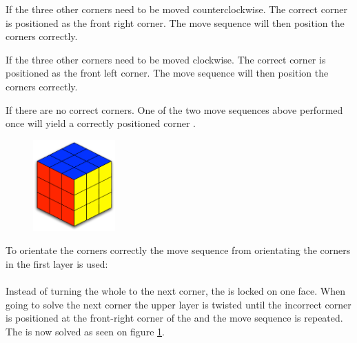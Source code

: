 If the three other corners need to be moved counterclockwise. The correct corner is positioned as the front right corner. The move sequence will then position the corners correctly.

If the three other corners need to be moved clockwise. The correct corner is positioned as the front left corner. The move sequence will then position the corners correctly.

If there are no correct corners. One of the two move sequences above performed once will yield a correctly positioned corner \cubie{}.

\begin{figure}
\begin{center}
	\includegraphics[width=0.28\textwidth]{input/pics/8done.pdf}	
\end{center}
\caption{}
\label{fig:8done}
\end{figure}

To orientate the corners correctly the move sequence from orientating the corners in the first layer is used: \\

 \\

Instead of turning the whole \cube{} to the next corner, the \cube{} is locked on one face. 
When going to solve the next corner \cubie{} the upper layer is twisted until the incorrect corner is positioned at the front-right corner \cubicle{} of the \cube{} and the move sequence is repeated. 
The \cube{} is now solved as seen on figure \ref{fig:8done}. 